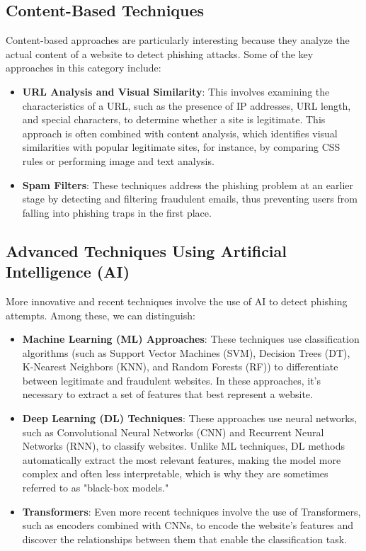 \subsection*{Content-Based Techniques}
Content-based approaches are particularly interesting because they analyze the actual content of a website to detect phishing attacks. Some of the key approaches in this category include:
\begin{itemize}
    \item \textbf{URL Analysis and Visual Similarity}: This involves examining the characteristics of a URL, such as the presence of IP addresses, URL length, and special characters, to determine whether a site is legitimate. This approach is often combined with content analysis, which identifies visual similarities with popular legitimate sites, for instance, by comparing CSS rules or performing image and text analysis.
    \item \textbf{Spam Filters}: These techniques address the phishing problem at an earlier stage by detecting and filtering fraudulent emails, thus preventing users from falling into phishing traps in the first place.
\end{itemize}

\subsection*{Advanced Techniques Using Artificial Intelligence (AI)}
More innovative and recent techniques involve the use of AI to detect phishing attempts. Among these, we can distinguish:
\begin{itemize}
    \item \textbf{Machine Learning (ML) Approaches}: These techniques use classification algorithms (such as Support Vector Machines (SVM), Decision Trees (DT), K-Nearest Neighbors (KNN), and Random Forests (RF)) to differentiate between legitimate and fraudulent websites. In these approaches, it's necessary to extract a set of features that best represent a website.
    \item \textbf{Deep Learning (DL) Techniques}: These approaches use neural networks, such as Convolutional Neural Networks (CNN) and Recurrent Neural Networks (RNN), to classify websites. Unlike ML techniques, DL methods automatically extract the most relevant features, making the model more complex and often less interpretable, which is why they are sometimes referred to as "black-box models."
    \item \textbf{Transformers}: Even more recent techniques involve the use of Transformers, such as encoders combined with CNNs, to encode the website's features and discover the relationships between them that enable the classification task.
\end{itemize}

